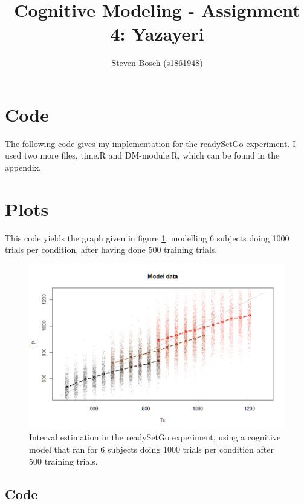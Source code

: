 \documentclass{article}
\title{Cognitive Modeling - Assignment 4: Yazayeri}
\author{Steven Bosch (s1861948)}
\begin{document}
\maketitle

\section{Code}
The following code gives my implementation for the readySetGo experiment. I used two more files, time.R and DM-module.R, which can be found in the appendix.


\section{Plots}
This code yields the graph given in figure \ref{fig1}, modelling 6 subjects doing 1000 trials per condition, after having done 500 training trials.

\begin{figure}[H]
	\centering
	\includegraphics[width=\textwidth]{1.png}
	\caption{Interval estimation in the readySetGo experiment, using a cognitive model that ran for 6 subjects doing 1000 trials per condition after 500 training trials.}
	\label{fig1}
\end{figure}

\begin{appendices}
	\section{Code}
	
	
\end{appendices}
\end{document}
